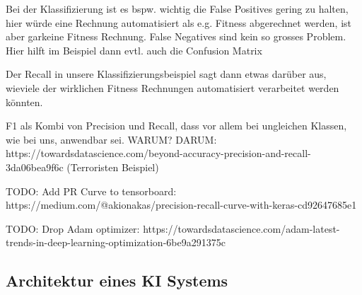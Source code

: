 Bei der Klassifizierung ist es bspw. wichtig die False Positives gering zu halten, hier würde eine Rechnung automatisiert als e.g. Fitness abgerechnet werden, ist aber garkeine Fitness Rechnung. False Negatives sind kein so grosses Problem. Hier hilft im Beispiel dann evtl. auch die Confusion Matrix

Der Recall in unsere Klassifizierungsbeispiel sagt dann etwas darüber aus, wieviele der wirklichen Fitness Rechnungen automatisiert verarbeitet werden könnten.

F1 als Kombi von Precision und Recall, dass vor allem bei ungleichen Klassen, wie bei uns, anwendbar sei. WARUM? DARUM: https://towardsdatascience.com/beyond-accuracy-precision-and-recall-3da06bea9f6c (Terroristen Beispiel)

TODO: Add PR Curve to tensorboard: https://medium.com/@akionakas/precision-recall-curve-with-keras-cd92647685e1

TODO: Drop Adam optimizer: https://towardsdatascience.com/adam-latest-trends-in-deep-learning-optimization-6be9a291375c

\subsection{Architektur eines KI Systems}


